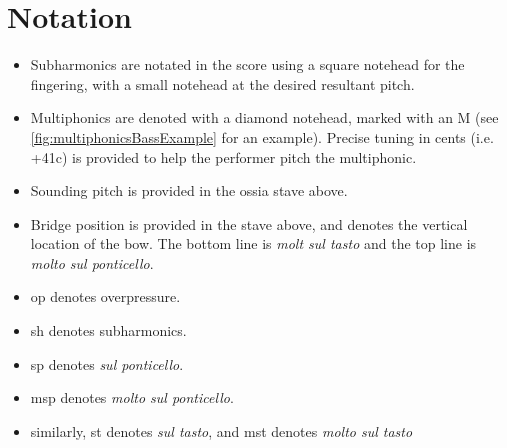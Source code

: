 \section*{Notation}
\begin{itemize}

    \item Subharmonics are notated in the score using a square notehead for the fingering, with a small notehead at the desired resultant pitch.
    \item Multiphonics are denoted with a diamond notehead, marked with an M (see \autoref{fig:multiphonicsBassExample} for an example). Precise tuning in cents (i.e. +41c) is provided to help the performer pitch the multiphonic.
    \item Sounding pitch is provided in the ossia stave above.
    \item Bridge position is provided in the stave above, and denotes the vertical location of the bow. The bottom line is \emph{molt sul tasto} and the top line is \emph{molto sul ponticello}.
    \item op denotes overpressure.
    \item sh denotes subharmonics.
    \item sp denotes \emph{sul ponticello}.
    \item msp denotes \emph{molto sul ponticello}.
    \item similarly, st denotes \emph{sul tasto}, and mst denotes \emph{molto sul tasto}
\end{itemize}

\newpage\label{app:bassPiece Score}

% 

